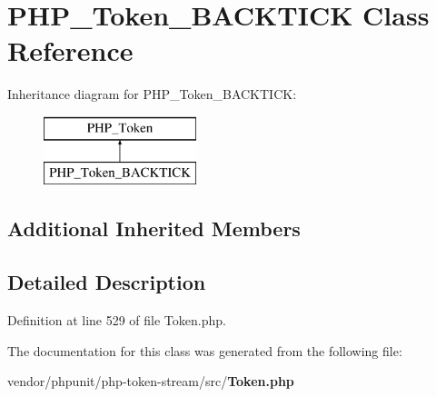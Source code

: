 \section{P\+H\+P\+\_\+\+Token\+\_\+\+B\+A\+C\+K\+T\+I\+C\+K Class Reference}
\label{class_p_h_p___token___b_a_c_k_t_i_c_k}
Inheritance diagram for P\+H\+P\+\_\+\+Token\+\_\+\+B\+A\+C\+K\+T\+I\+C\+K\+:\begin{figure}[H]
\begin{center}
\leavevmode
\includegraphics[height=2.000000cm]{class_p_h_p___token___b_a_c_k_t_i_c_k}
\end{center}
\end{figure}
\subsection*{Additional Inherited Members}


\subsection{Detailed Description}


Definition at line 529 of file Token.\+php.



The documentation for this class was generated from the following file\+:\begin{DoxyCompactItemize}
\item 
vendor/phpunit/php-\/token-\/stream/src/{\bf Token.\+php}\end{DoxyCompactItemize}
